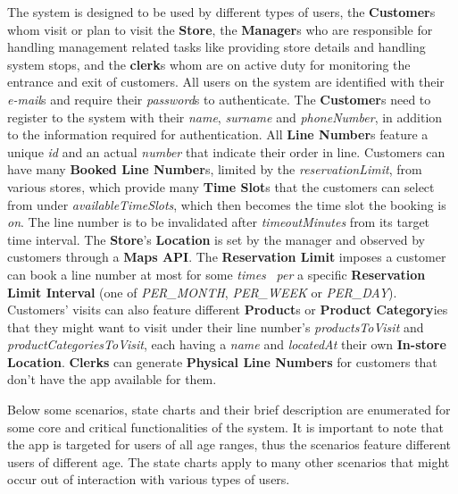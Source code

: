 The system is designed to be used by different types of users, the \textbf{Customer}s whom visit or plan to visit the \textbf{Store}, the \textbf{Manager}s who are responsible for handling management related tasks like providing store details and handling system stops, and the \textbf{clerk}s whom are on active duty for monitoring the entrance and exit of customers.
All users on the system are identified with their \textit{e-mail}s and require their \textit{password}s to authenticate.
The \textbf{Customer}s need to register to the system with their \textit{name}, \textit{surname} and \textit{phoneNumber}, in addition to the information required for authentication.
All \textbf{Line Number}s feature a unique \textit{id} and an actual \textit{number} that indicate their order in line.
Customers can have many \textbf{Booked Line Number}s, limited by the \textit{reservationLimit}, from various stores, which provide many \textbf{Time Slot}s that the customers can select from under \textit{availableTimeSlots}, which then becomes the time slot the booking is \textit{on}.
The line number is to be invalidated after \textit{timeoutMinutes} from its target time interval.
The \textbf{Store}'s \textbf{Location} is set by the manager and observed by customers through a \textbf{Maps API}.
The \textbf{Reservation Limit} imposes a customer can book a line number at most for some \textit{times} \ \textit{per} a specific \textbf{Reservation Limit Interval} (one of \textit{PER\_MONTH}, \textit{PER\_WEEK} or \textit{PER\_DAY}).
Customers' visits can also feature different \textbf{Product}s or \textbf{Product Category}ies that they might want to visit under their line number's \textit{productsToVisit} and \textit{productCategoriesToVisit}, each having a \textit{name} and \textit{locatedAt} their own \textbf{In-store Location}.
\textbf{Clerks} can generate \textbf{Physical Line Numbers} for customers that don't have the app available for them.

Below some scenarios, state charts and their brief description are enumerated for some core and critical functionalities of the system.
It is important to note that the app is targeted for users of all age ranges, thus the scenarios feature different users of different age.
The state charts apply to many other scenarios that might occur out of interaction with various types of users.


